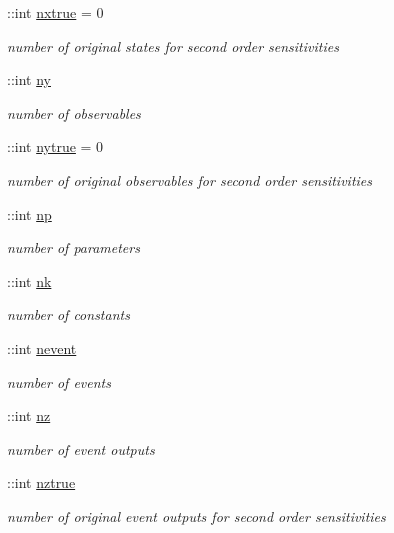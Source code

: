 \begin{DoxyCompactItemize}
\+::int \hyperlink{classamimodel_a49c476de14a021114feb8c95da04952a}{nxtrue} = 0
\begin{DoxyCompactList}\small\item\em number of original states for second order sensitivities \end{DoxyCompactList}\item 
\+::int \hyperlink{classamimodel_a289ca425eb368f1d582b6be2be0d3dfc}{ny}
\begin{DoxyCompactList}\small\item\em number of observables \end{DoxyCompactList}\item 
\+::int \hyperlink{classamimodel_ac91d7b36031ec122abc9f739692b02e8}{nytrue} = 0
\begin{DoxyCompactList}\small\item\em number of original observables for second order sensitivities \end{DoxyCompactList}\item 
\+::int \hyperlink{classamimodel_a6f6e2fe71b05c4c2f2d967ce9ca02dfd}{np}
\begin{DoxyCompactList}\small\item\em number of parameters \end{DoxyCompactList}\item 
\+::int \hyperlink{classamimodel_afd6bea572754e0c3c320664bdccf0200}{nk}
\begin{DoxyCompactList}\small\item\em number of constants \end{DoxyCompactList}\item 
\+::int \hyperlink{classamimodel_aab5c7f06273122b68624eb3bca6a9b6e}{nevent}
\begin{DoxyCompactList}\small\item\em number of events \end{DoxyCompactList}\item 
\+::int \hyperlink{classamimodel_a79f11413e5bfe18a0e71e17574399ad5}{nz}
\begin{DoxyCompactList}\small\item\em number of event outputs \end{DoxyCompactList}\item 
\+::int \hyperlink{classamimodel_a364ecd990baeeefd1de3e6795cd50a58}{nztrue}
\begin{DoxyCompactList}\small\item\em number of original event outputs for second order sensitivities \end{DoxyCompactList}\item 

\end{DoxyCompactItemize}
